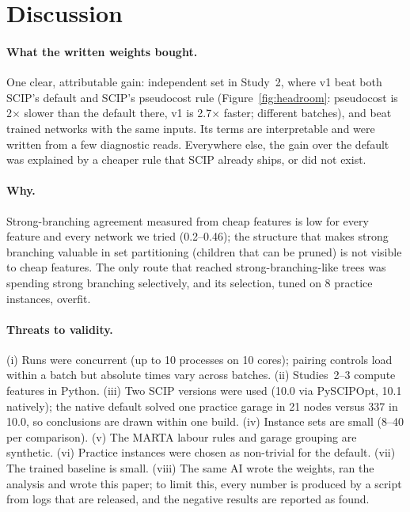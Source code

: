 \documentclass[11pt]{article}
\begin{document}
\section{Discussion}

\paragraph{What the written weights bought.} One clear, attributable gain: independent set in
Study~2, where v1 beat both SCIP's default and SCIP's pseudocost rule (Figure~\ref{fig:headroom}:
pseudocost is 2$\times$ slower than the default there, v1 is 2.7$\times$ faster; different batches), and beat trained
networks with the same inputs. Its terms are interpretable and were written from a few diagnostic
reads. Everywhere else, the gain over the default was explained by a cheaper rule that SCIP
already ships, or did not exist.

\paragraph{Why.} Strong-branching agreement measured from cheap features is low for every feature
and every network we tried (0.2--0.46); the structure that makes strong branching valuable in
set partitioning (children that can be pruned) is not visible to cheap features. The only route
that reached strong-branching-like trees was spending strong branching selectively, and its
selection, tuned on 8 practice instances, overfit.

\paragraph{Threats to validity.} (i) Runs were concurrent (up to 10 processes on 10 cores);
pairing controls load within a batch but absolute times vary across batches. (ii) Studies~2--3
compute features in Python. (iii) Two SCIP versions were used (10.0 via PySCIPOpt, 10.1 natively);
the native default solved one practice garage in 21 nodes versus 337 in 10.0, so conclusions are
drawn within one build. (iv) Instance sets are small (8--40 per comparison). (v) The MARTA labour
rules and garage grouping are synthetic. (vi) Practice instances were chosen as non-trivial for
the default. (vii) The trained baseline is small. (viii) The same AI wrote the weights, ran the
analysis and wrote this paper; to limit this, every number is produced by a script from logs that
are released, and the negative results are reported as found.
\end{document}
